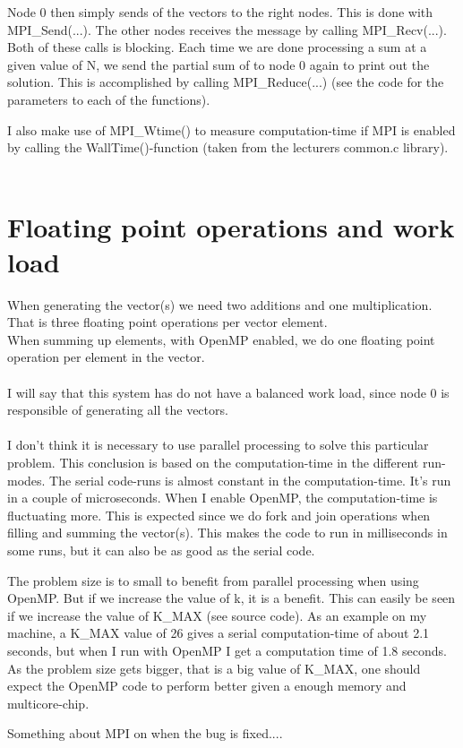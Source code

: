 \documentclass{article}
\begin{document}
Node 0 then simply sends of the vectors to the right nodes. This is done with MPI\_Send(...). The other nodes receives the message by calling MPI\_Recv(...). Both of these calls is blocking. Each time we are done processing a sum at a given value of N, we send the partial sum of to node 0 again to print out the solution. This is accomplished by calling MPI\_Reduce(...) (see the code for the parameters to each of the functions).    

I also make use of MPI\_Wtime() to measure computation-time if MPI is enabled by calling the WallTime()-function (taken from the lecturers common.c library). \\ \\



\section*{Floating point operations and work load}
When generating the vector(s) we need two additions and one multiplication. That is three floating point operations per vector element.\\
When summing up elements, with OpenMP enabled, we do one floating point operation per element in the vector. \\ \\

I will say that this system has do not have a balanced work load, since node 0 is responsible of generating all the vectors. \\ \\



I don't think it is necessary to use parallel processing to solve this particular problem. This conclusion is based on the computation-time in the different run-modes. The serial code-runs is almost constant in the computation-time. It's run in a couple of microseconds. When I enable OpenMP, the computation-time is fluctuating more. This is expected since we do fork and join operations when filling and summing the vector(s). This makes the code to run in milliseconds in some runs, but it can also be as good as the serial code. 

The problem size is to small to benefit from parallel processing when using OpenMP. But if we increase the value of k, it is a benefit. This can easily be seen if we increase the value of K\_MAX (see source code). As an example on my machine, a K\_MAX value of 26 gives a serial computation-time of about 2.1 seconds, but when I run with OpenMP I get a computation time of 1.8 seconds. As the problem size gets bigger, that is a big value of K\_MAX, one should expect the OpenMP code to perform better given a enough memory and multicore-chip. 

Something about MPI on when the bug is fixed.... 
\end{document}
